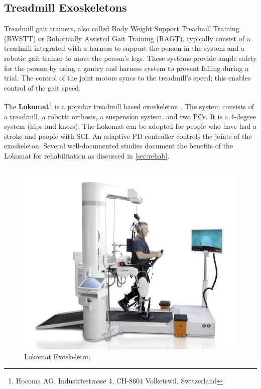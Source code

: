 \subsection{Treadmill Exoskeletons}

Treadmill gait trainers, also called Body Weight Support Treadmill Training (BWSTT) or Robotically Assisted Gait Training (RAGT), typically consist of a treadmill integrated with a harness to support the person in the system and a robotic gait trainer to move the person's legs. These systems provide ample safety for the person by using a gantry and harness system to prevent falling during a trial. The control of the joint motors syncs to the treadmill's speed; this enables control of the gait speed.
 
The \textbf{Lokomat}\footnote{Hocoma AG, Industriestrasse 4, CH-8604 Volketswil, Switzerland } is a popular treadmill based exoskeleton \cite{jezernik2003robotic}. The system consists of a treadmill, a robotic orthosis, a suspension system, and two PCs. It is a 4-degree system (hips and knees). The Lokomat can be adopted for people who have had a stroke and people with SCI. An adaptive PD controller controls the joints of the exoskeleton. Several well-documented studies document the benefits of the Lokomat for rehabilitation as discussed in \autoref{sec:rehab}.
 
 
\begin{figure}[H]
    \centering
    \includegraphics[scale=0.25]{images/background/loko.jpg}
    \caption[Lokomat Exoskeleton]{Lokomat Exoskeleton}
    \label{fig:loko}
\end{figure} 
 
